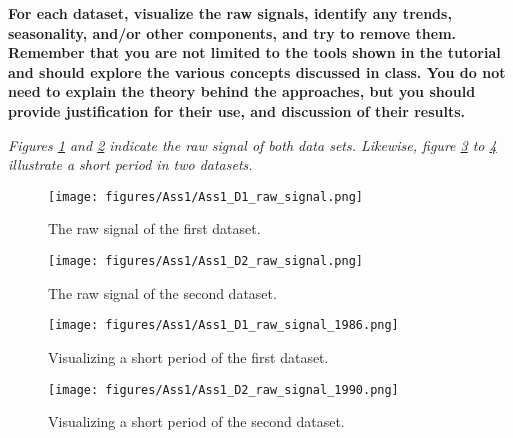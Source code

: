 \item \textbf{For each dataset, visualize the raw signals, identify any trends, seasonality, and/or other components, and try to remove them. Remember that you are not limited to the tools shown in the tutorial and should explore the various concepts discussed in class. You do not need to explain the theory behind the approaches, but you should provide justification for their use, and discussion of their results.}


\textit{Figures \ref{fig:Ass1_D1_raw_signal} and \ref{fig:Ass1_D2_raw_signal} indicate the raw signal of both data sets. Likewise, figure \ref{fig:Ass1_D1_raw_signal_1986} to  \ref{fig:Ass1_D2_raw_signal_1990} illustrate a short period in two datasets. }

\begin{figure}[H]
    \centering
    \begin{minipage}[b]{1\textwidth}
        \texttt{[image: figures/Ass1/Ass1\_D1\_raw\_signal.png]}
    \end{minipage}
    \caption{The raw signal of the first dataset.}
    \label{fig:Ass1_D1_raw_signal}
\end{figure}

\begin{figure}[H]
    \centering
    \begin{minipage}[b]{1\textwidth}
        \texttt{[image: figures/Ass1/Ass1\_D2\_raw\_signal.png]}
    \end{minipage}
    \caption{The raw signal of the second dataset.}
    \label{fig:Ass1_D2_raw_signal}
\end{figure}

\begin{figure}[H]
    \centering
    \begin{minipage}[b]{1\textwidth}
        \texttt{[image: figures/Ass1/Ass1\_D1\_raw\_signal\_1986.png]}
    \end{minipage}
    \caption{Visualizing a short period of the first dataset.}
    \label{fig:Ass1_D1_raw_signal_1986}
\end{figure}


\begin{figure}[H]
    \centering
    \begin{minipage}[b]{1\textwidth}
        \texttt{[image: figures/Ass1/Ass1\_D2\_raw\_signal\_1990.png]}
    \end{minipage}
    \caption{Visualizing a short period of the second dataset.}
    \label{fig:Ass1_D2_raw_signal_1990}
\end{figure}

